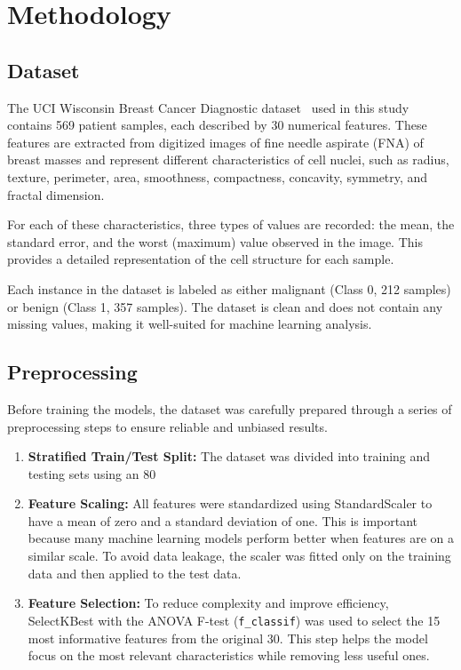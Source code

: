 \documentclass[conference]{IEEEtran}
\begin{document}
\section{Methodology}

\subsection{Dataset}

The UCI Wisconsin Breast Cancer Diagnostic dataset~\cite{uci_wdbc} used in this study contains 569 patient samples, each described by 30 numerical features. These features are extracted from digitized images of fine needle aspirate (FNA) of breast masses and represent different characteristics of cell nuclei, such as radius, texture, perimeter, area, smoothness, compactness, concavity, symmetry, and fractal dimension.

For each of these characteristics, three types of values are recorded: the mean, the standard error, and the worst (maximum) value observed in the image. This provides a detailed representation of the cell structure for each sample.

Each instance in the dataset is labeled as either malignant (Class 0, 212 samples) or benign (Class 1, 357 samples). The dataset is clean and does not contain any missing values, making it well-suited for machine learning analysis.

\subsection{Preprocessing}

Before training the models, the dataset was carefully prepared through a series of preprocessing steps to ensure reliable and unbiased results.

\begin{enumerate}
\item \textbf{Stratified Train/Test Split:} The dataset was divided into training and testing sets using an 80%

\item \textbf{Feature Scaling:} All features were standardized using StandardScaler to have a mean of zero and a standard deviation of one. This is important because many machine learning models perform better when features are on a similar scale. To avoid data leakage, the scaler was fitted only on the training data and then applied to the test data.

\item \textbf{Feature Selection:} To reduce complexity and improve efficiency, SelectKBest with the ANOVA F-test (\texttt{f\_classif}) was used to select the 15 most informative features from the original 30. This step helps the model focus on the most relevant characteristics while removing less useful ones.
\end{enumerate}
\end{document}
